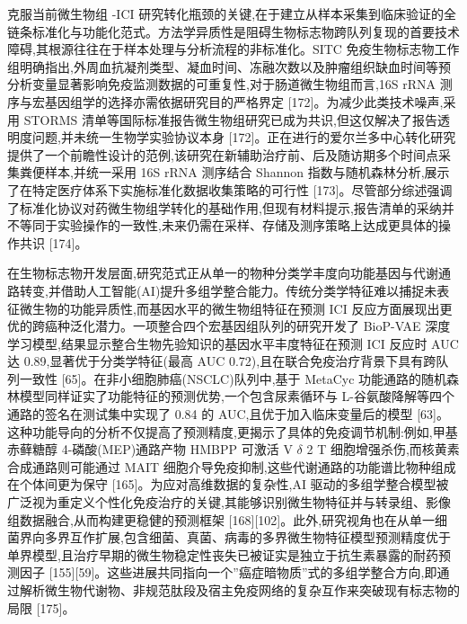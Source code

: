 克服当前微生物组 -ICI 研究转化瓶颈的关键,在于建立从样本采集到临床验证的全链条标准化与功能化范式。方法学异质性是阻碍生物标志物跨队列复现的首要技术障碍,其根源往往在于样本处理与分析流程的非标准化。SITC 免疫生物标志物工作组明确指出,外周血抗凝剂类型、凝血时间、冻融次数以及肿瘤组织缺血时间等预分析变量显著影响免疫监测数据的可重复性,对于肠道微生物组而言,16S rRNA 测序与宏基因组学的选择亦需依据研究目的严格界定 {[}172{]}。为减少此类技术噪声,采用 STORMS 清单等国际标准报告微生物组研究已成为共识,但这仅解决了报告透明度问题,并未统一生物学实验协议本身 {[}172{]}。正在进行的爱尔兰多中心转化研究提供了一个前瞻性设计的范例,该研究在新辅助治疗前、后及随访期多个时间点采集粪便样本,并统一采用 16S rRNA 测序结合 Shannon 指数与随机森林分析,展示了在特定医疗体系下实施标准化数据收集策略的可行性 {[}173{]}。尽管部分综述强调了标准化协议对药微生物组学转化的基础作用,但现有材料提示,报告清单的采纳并不等同于实验操作的一致性,未来仍需在采样、存储及测序策略上达成更具体的操作共识 {[}174{]}。

在生物标志物开发层面,研究范式正从单一的物种分类学丰度向功能基因与代谢通路转变,并借助人工智能(AI)提升多组学整合能力。传统分类学特征难以捕捉未表征微生物的功能异质性,而基因水平的微生物组特征在预测 ICI 反应方面展现出更优的跨癌种泛化潜力。一项整合四个宏基因组队列的研究开发了 BioP-VAE 深度学习模型,结果显示整合生物先验知识的基因水平丰度特征在预测 ICI 反应时 AUC 达 0.89,显著优于分类学特征(最高 AUC 0.72),且在联合免疫治疗背景下具有跨队列一致性 {[}65{]}。在非小细胞肺癌(NSCLC)队列中,基于 MetaCyc 功能通路的随机森林模型同样证实了功能特征的预测优势,一个包含尿素循环与 L-谷氨酸降解等四个通路的签名在测试集中实现了 0.84 的 AUC,且优于加入临床变量后的模型 {[}63{]}。这种功能导向的分析不仅提高了预测精度,更揭示了具体的免疫调节机制:例如,甲基赤藓糖醇 4-磷酸(MEP)通路产物 HMBPP 可激活 V \(\delta\) 2 T 细胞增强杀伤,而核黄素合成通路则可能通过 MAIT 细胞介导免疫抑制,这些代谢通路的功能谱比物种组成在个体间更为保守 {[}165{]}。为应对高维数据的复杂性,AI 驱动的多组学整合模型被广泛视为重定义个性化免疫治疗的关键,其能够识别微生物特征并与转录组、影像组数据融合,从而构建更稳健的预测框架 {[}168{]}{[}102{]}。此外,研究视角也在从单一细菌界向多界互作扩展,包含细菌、真菌、病毒的多界微生物特征模型预测精度优于单界模型,且治疗早期的微生物稳定性丧失已被证实是独立于抗生素暴露的耐药预测因子 {[}155{]}{[}59{]}。这些进展共同指向一个''癌症暗物质''式的多组学整合方向,即通过解析微生物代谢物、非规范肽段及宿主免疫网络的复杂互作来突破现有标志物的局限 {[}175{]}。

